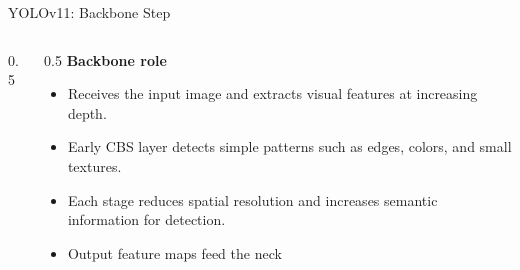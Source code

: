 \documentclass[aspectratio=169]{beamer}
\begin{document}
\begin{frame}{YOLOv11: Backbone Step}
\begin{columns}[c]
\begin{column}{0.5\textwidth}
    \end{column}
    \begin{column}{0.5\textwidth}
      \textbf{Backbone role}
      \begin{itemize}
        \item Receives the input image and extracts visual features at increasing depth.
        \item Early CBS layer detects simple patterns such as edges, colors, and small textures.
        \item Each stage reduces spatial resolution and increases semantic information for detection.
        \item Output feature maps feed the neck
      \end{itemize}
    \end{column}
  \end{columns}
\end{frame}
\end{document}
